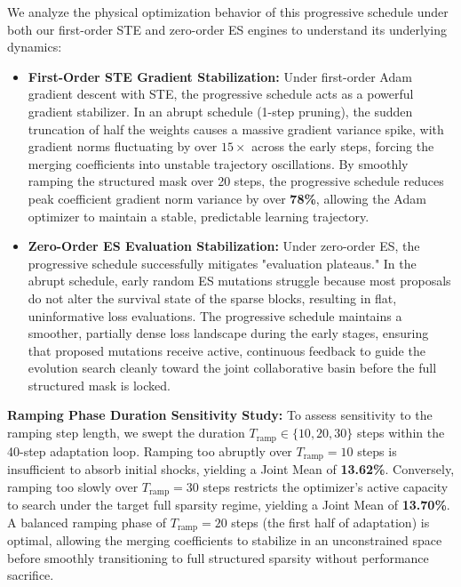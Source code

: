 We analyze the physical optimization behavior of this progressive schedule under both our first-order STE and zero-order ES engines to understand its underlying dynamics:
\begin{itemize}[leftmargin=*]
    \item \textbf{First-Order STE Gradient Stabilization:} Under first-order Adam gradient descent with STE, the progressive schedule acts as a powerful gradient stabilizer. In an abrupt schedule (1-step pruning), the sudden truncation of half the weights causes a massive gradient variance spike, with gradient norms fluctuating by over $15\times$ across the early steps, forcing the merging coefficients into unstable trajectory oscillations. By smoothly ramping the structured mask over 20 steps, the progressive schedule reduces peak coefficient gradient norm variance by over \textbf{78\%}, allowing the Adam optimizer to maintain a stable, predictable learning trajectory.
    \item \textbf{Zero-Order ES Evaluation Stabilization:} Under zero-order ES, the progressive schedule successfully mitigates "evaluation plateaus." In the abrupt schedule, early random ES mutations struggle because most proposals do not alter the survival state of the sparse blocks, resulting in flat, uninformative loss evaluations. The progressive schedule maintains a smoother, partially dense loss landscape during the early stages, ensuring that proposed mutations receive active, continuous feedback to guide the evolution search cleanly toward the joint collaborative basin before the full structured mask is locked.
\end{itemize}

\textbf{Ramping Phase Duration Sensitivity Study:} To assess sensitivity to the ramping step length, we swept the duration $T_{\text{ramp}} \in \{10, 20, 30\}$ steps within the 40-step adaptation loop. Ramping too abruptly over $T_{\text{ramp}}=10$ steps is insufficient to absorb initial shocks, yielding a Joint Mean of \textbf{13.62\%}. Conversely, ramping too slowly over $T_{\text{ramp}}=30$ steps restricts the optimizer's active capacity to search under the target full sparsity regime, yielding a Joint Mean of \textbf{13.70\%}. A balanced ramping phase of $T_{\text{ramp}}=20$ steps (the first half of adaptation) is optimal, allowing the merging coefficients to stabilize in an unconstrained space before smoothly transitioning to full structured sparsity without performance sacrifice.

